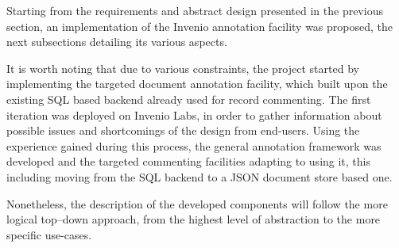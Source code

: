
Starting from the requirements and abstract design presented in the previous
section, an implementation of the Invenio annotation facility was proposed,
the next subsections detailing its various aspects.

It is worth noting that due to various constraints, the project started by
implementing the targeted document annotation facility, which built upon the
existing SQL based backend already used for record commenting. The first
iteration was deployed on Invenio Labs, in order to gather information about
possible issues and shortcomings of the design from end-users. Using the
experience gained during this process, the general annotation framework was
developed and the targeted commenting facilities adapting to using it, this
including moving from the SQL backend to a JSON document store based one.

Nonetheless, the description of the developed components will follow the more
logical top--down approach, from the highest level of abstraction to the more
specific use-cases.
